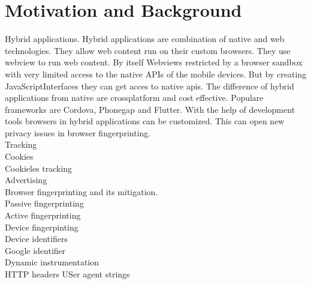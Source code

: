 \section{Motivation and Background}

Hybrid applications.
Hybrid applications are combination of native and web technologies. They allow web content run on their custom browsers. They use webview to run web content. By itself Webviews restricted by  a browser sandbox with very limited access to the native APIs of the mobile devices. But by creating JavaScriptInterfaces they can get acces to native apis. 
The difference of hybrid applications from native are crossplatform and cost effective. Populare frameworks are Cordova, Phonegap and Flutter. With the help of development tools browsers in hybrid applications can be customized. This can open new privacy issues in browser fingerprinting.  \\
Tracking \\
Cookies \\
Cookieles tracking\\
Advertising\\
Browser fingerprinting and its mitigation.\\
Passive fingerprinting \\
Active fingerprinting\\
Device fingerpinting\\
Device identifiers\\
Google identifier\\
Dynamic instrumentation\\
HTTP headers USer agent strings\\